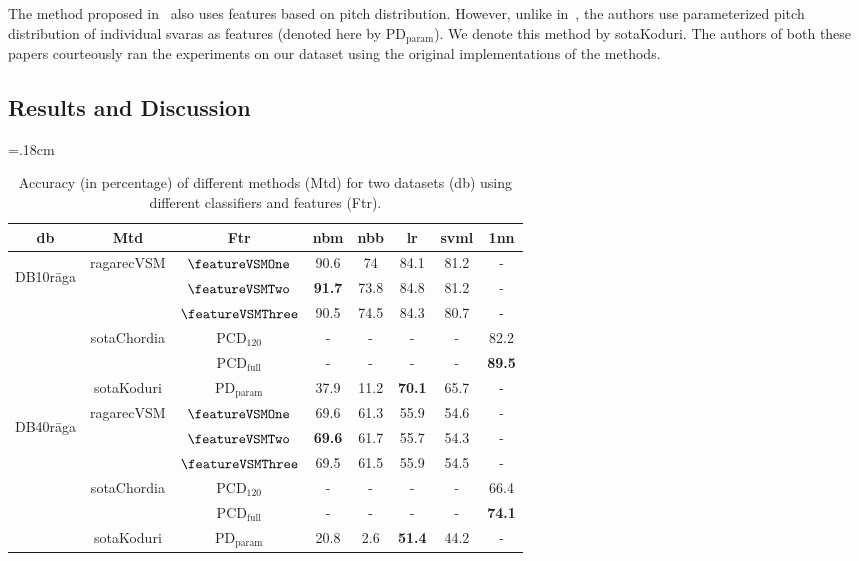 The method proposed in~\cite{koduri2014intonation} also uses features based on pitch distribution. However, unlike in~\cite{chordia2013joint}, the authors use parameterized pitch distribution of individual svaras as features (denoted here by $\mathrm{PD}_\mathrm{param}$). We denote this method by \acrshort{sotaKoduri}. The authors of both these papers courteously ran the experiments on our dataset using the original implementations of the methods. 



\subsection{Results and Discussion}
\label{sec:vsm_eval_results}


\begin{table}
	\tabcolsep=.18cm
	\centering
	\begin{tabular}{c|c|c|c c c c c}
		\hline
		db & Mtd & Ftr & \acrshort{nbm} & \acrshort{nbb} & \acrshort{lr} & \acrshort{svml} & \acrshort{1nn}\tabularnewline
		\hline \hline 
		\multirow{5}{*}{\begin{turn}{90}DB10r\={a}ga\end{turn}} & \multirow{3}{*}{\acrshort{ragarecVSM}} & $\featureVSMOne$ & 90.6 & 74 & 84.1 & 81.2 & -\tabularnewline
		
		&  & $\featureVSMTwo$ & {\bf 91.7} & 73.8 & 84.8 & 81.2 & -\tabularnewline
		
		&  & $\featureVSMThree$ & 90.5 & 74.5 & 84.3 & 80.7 & -\tabularnewline
		\cline{2-8} 
		& \multirow{2}{*}{\acrshort{sotaChordia}} & $\mathrm{PCD}_{120}$ & - & - & - & - & 82.2\tabularnewline
		& & $\mathrm{PCD}_\mathrm{full}$ & - & - & - & - & {\bf 89.5}\tabularnewline
		\cline{2-8} 
		& \acrshort{sotaKoduri} & $\mathrm{PD}_\mathrm{param}$ & 37.9 & 11.2 & {\bf 70.1} & 65.7 & -\tabularnewline
		\hline \hline
		\multirow{5}{*}{\begin{turn}{90}DB40r\={a}ga\end{turn}} & \multirow{3}{*}{\acrshort{ragarecVSM}} & $\featureVSMOne$ & 69.6 & 61.3 & 55.9 & 54.6 & -\tabularnewline
		
		&  & $\featureVSMTwo$ & {\bf 69.6} & 61.7 & 55.7 & 54.3 & -\tabularnewline
		
		&  & $\featureVSMThree$ & 69.5 & 61.5 & 55.9 & 54.5 & -\tabularnewline
		\cline{2-8} 
		& \multirow{2}{*}{\acrshort{sotaChordia}} & $\mathrm{PCD}_{120}$ & - & - & - & - & 66.4\tabularnewline
		
		& & $\mathrm{PCD}_\mathrm{full}$ & - & - & - & - & {\bf 74.1}\tabularnewline
		\cline{2-8} 
		& \acrshort{sotaKoduri} & $\mathrm{PD}_\mathrm{param}$ & 20.8 & 2.6 & {\bf 51.4} & 44.2 & -\tabularnewline
		\hline \hline
	\end{tabular}
	
	\caption{Accuracy (in percentage) of different methods (Mtd) for two datasets (db) using different classifiers and features (Ftr).} 
	\label{tab:accuracies_for_variants}
\end{table}



